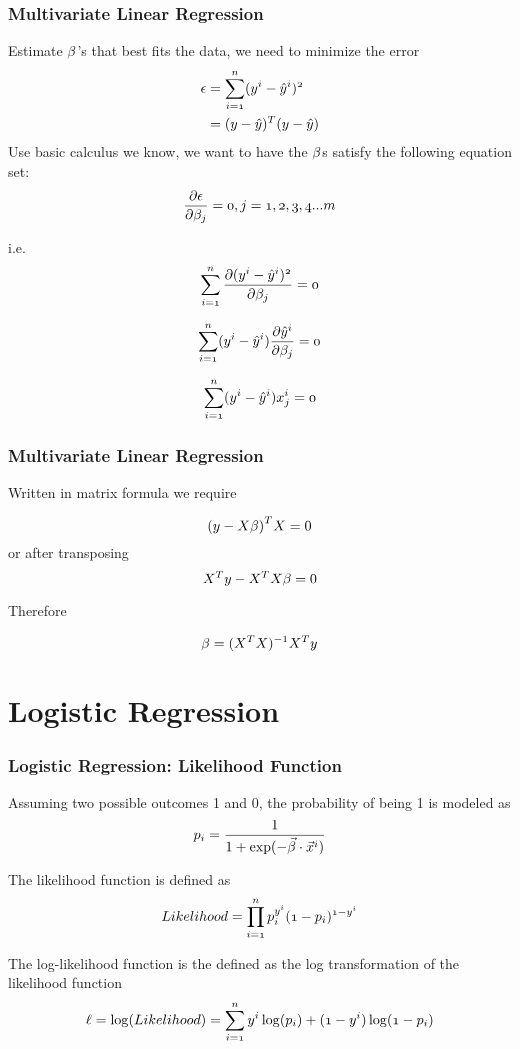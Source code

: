 \documentclass[notheorems, aspectratio=54]{beamer}
\begin{document}
\begin{frame}
\frametitle{Multivariate Linear Regression}
Estimate $\mathnormal{\beta}$'s that best fits the data, we need to minimize the error
    \begin{align*}
        \mathnormal{\epsilon}&=\mathnormal{\sum\limits_{i=1}^{n}(y^{i}-\hat{y}^{i})^2}\\
                &=\mathnormal{(y-\hat{y})^T(y-\hat{y})}
    \end{align*}
Use basic calculus we know, we want to have the  $\mathnormal{\beta}$s satisfy the following equation set:
$$
 \mathnormal{\frac{\partial \epsilon}{\partial \beta_j}=0, j=1, 2, 3, 4 ... m}
$$
\end{frame}

\begin{frame}
i.e.
$$
\mathnormal{\sum\limits_{i=1}^{n}\frac{\partial (y^{i}-\hat{y}^{i})^2}{\partial \beta_j}=0}
$$

$$
\mathnormal{\sum\limits_{i=1}^{n}(y^{i}-\hat{y}^{i})\frac{\partial\hat{y}^{i}}{\partial \beta_j}=0}
$$

$$
\mathnormal{\sum\limits_{i=1}^{n}(y^{i}-\hat{y}^{i})x^{i}_{j}=0}
$$

\end{frame}
\begin{frame}

\frametitle{Multivariate Linear Regression}

Written in matrix formula we require

$$
\mathnormal{(y-X \beta)}^{T}\mathnormal{X}=0
$$
or after transposing
$$
\mathnormal{X^{T}}\mathnormal{y}-\mathnormal{X^T}\mathnormal{X}\beta=0
$$

Therefore 

$$
\beta=(\mathnormal{X^T}\mathnormal{X})^{-1}\mathnormal{X^{T}}\mathnormal{y}
$$

\end{frame}

\section{Logistic Regression}

\begin{frame}

\frametitle{Logistic Regression: Likelihood Function}
Assuming two possible outcomes 1 and 0, the probability of being 1 is modeled as $$\mathnormal{p_i}=\frac{1}{1+\mathnormal{\exp(-\vec{\beta}\cdot\vec{x}^i)}}$$

The likelihood function is defined as 
\begin{align*}
\mathnormal{Likelihood}&=\mathnormal{\prod_{i=1}^{n}p_{i}^{y^i}(1-p_{i})^{1-y^{i}}}\\
\end{align*}

The log-likelihood function is the defined as the log transformation of the likelihood function
\begin{align*}
\mathnormal{\ell}=\mathnormal{\log(Likelihood)}
&=\mathnormal{\sum_{i=1}^{n}y^i\log(p_i)+(1-y^i)\log(1-p_i)}\\
\end{align*}

\end{frame}
\end{document}
